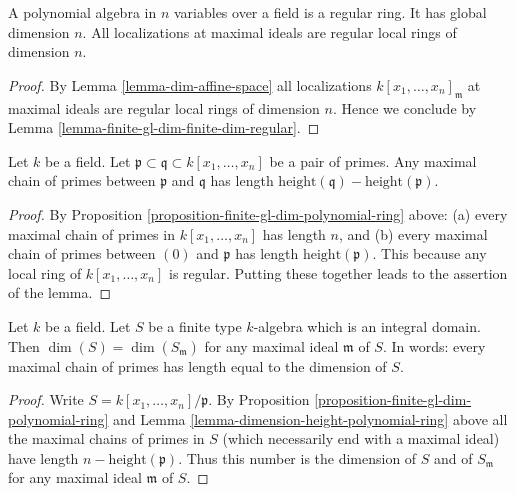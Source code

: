 \begin{proposition}
\label{proposition-finite-gl-dim-polynomial-ring}
A polynomial algebra in $n$ variables over a field is a regular ring.
It has global dimension $n$. All localizations at maximal ideals
are regular local rings of dimension $n$.
\end{proposition}

\begin{proof}
By Lemma \ref{lemma-dim-affine-space}
all localizations $k[x_1, \ldots, x_n]_{\mathfrak m}$
at maximal ideals are regular local rings of dimension $n$. Hence
we conclude by Lemma \ref{lemma-finite-gl-dim-finite-dim-regular}.
\end{proof}

\begin{lemma}
\label{lemma-dimension-height-polynomial-ring}
Let $k$ be a field.
Let $\mathfrak p \subset \mathfrak q \subset k[x_1, \ldots, x_n]$
be a pair of primes.
Any maximal chain of primes between $\mathfrak p$ and $\mathfrak q$
has length $\text{height}(\mathfrak q) - \text{height}(\mathfrak p)$.
\end{lemma}

\begin{proof}
By Proposition \ref{proposition-finite-gl-dim-polynomial-ring} above:
(a) every maximal chain of primes in $k[x_1, \ldots, x_n]$
has length $n$, and (b) every maximal chain of primes
between $(0)$ and $\mathfrak p$ has length $\text{height}(\mathfrak p)$.
This because any local ring of $k[x_1, \ldots, x_n]$ is regular.
Putting these together leads to the assertion of the lemma.
\end{proof}

\begin{lemma}
\label{lemma-dimension-spell-it-out}
Let $k$ be a field.
Let $S$ be a finite type $k$-algebra which is an integral domain.
Then $\dim(S) = \dim(S_{\mathfrak m})$ for any maximal
ideal $\mathfrak m$ of $S$. In words: every maximal chain
of primes has length equal to the dimension of $S$.
\end{lemma}

\begin{proof}
Write $S = k[x_1, \ldots, x_n]/\mathfrak p$.
By Proposition \ref{proposition-finite-gl-dim-polynomial-ring} and
Lemma \ref{lemma-dimension-height-polynomial-ring} above
all the maximal chains of primes in $S$ (which necessarily end
with a maximal ideal) have length $n - \text{height}(\mathfrak p)$.
Thus this number is the dimension of $S$ and of $S_{\mathfrak m}$
for any maximal ideal $\mathfrak m$ of $S$.
\end{proof}

